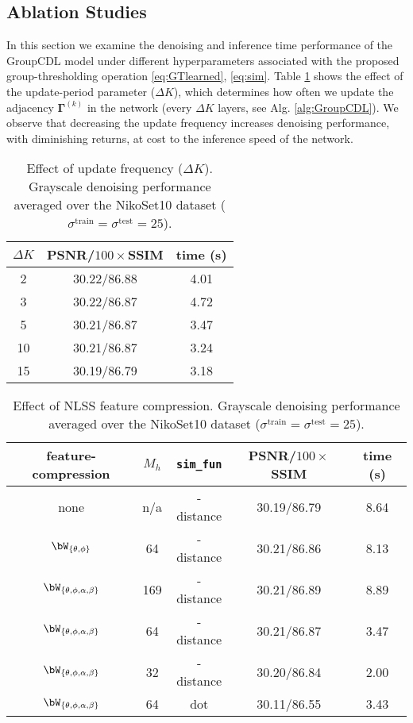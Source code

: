 \documentclass[lettersize,journal]{IEEEtran}
\newcommand{\sigmatrain}{\sigma^{\mathrm{train}}}
\newcommand{\sigmatest}{\sigma^{\mathrm{test}}}
\newcommand{\ADJMAT}{\boldsymbol{\Gamma}}
\begin{document}
\subsection{Ablation Studies} \label{sec:ablation}
In this section we examine the denoising and inference time performance of the
GroupCDL model under different hyperparameters associated with the proposed
group-thresholding operation \eqref{eq:GTlearned}, \eqref{eq:sim}. Table
\ref{tab:ablation:update} shows the effect of the update-period parameter
($\Delta K$), which determines how often we update the adjacency $\ADJMAT^{(k)}$
in the network (every $\Delta K$ layers, see Alg. \ref{alg:GroupCDL}). We observe that decreasing the update
frequency increases denoising performance, with diminishing returns, at cost to
the inference speed of the network.
\begin{table}[ht]
    \centering
    \caption{Effect of update frequency ($\Delta K$). Grayscale denoising performance
    averaged over the NikoSet10 dataset ($\sigmatrain=\sigmatest=25$).}
    \begin{tabular}{c|cc}
        \hline
        $\Delta K$ & PSNR/$100\times$SSIM & time (s)\\
        \hline
        2 & 30.22/86.88 & 4.01 \\
        3 & 30.22/86.87 & 4.72 \\
        5 & 30.21/86.87 & 3.47 \\
        10 & 30.21/86.87 & 3.24 \\
        15 & 30.19/86.79 & 3.18 \\
        \hline
    \end{tabular}
    \label{tab:ablation:update}
\end{table}
\begin{table}[ht]
    \centering
    \caption{Effect of NLSS feature compression. Grayscale denoising performance
    averaged over the NikoSet10 dataset ($\sigmatrain=\sigmatest=25$).}
    \begin{tabular}{ccc|cc}
        \hline
        feature-compression & $M_h$ & \texttt{sim\_fun} & PSNR/$100\times$SSIM & time (s) \\
        \hline
        none & n/a & -distance & 30.19/86.79 & 8.64 \\
        $\bW_{\{\theta, \phi\}}$ & 64 & -distance & 30.21/86.86 & 8.13 \\
        $\bW_{\{\theta, \phi, \alpha, \beta\}}$ & 169 & -distance & 30.21/86.89 & 8.89 \\
        $\bW_{\{\theta, \phi, \alpha, \beta\}}$ & 64 & -distance & 30.21/86.87 & 3.47 \\
        $\bW_{\{\theta, \phi, \alpha, \beta\}}$ & 32 & -distance & 30.20/86.84 & 2.00 \\
        $\bW_{\{\theta, \phi, \alpha, \beta\}}$ & 64 & dot & 30.11/86.55 & 3.43 \\
        \hline
    \end{tabular}
    \label{tab:ablation:nlss}
\end{table}
\end{document}
